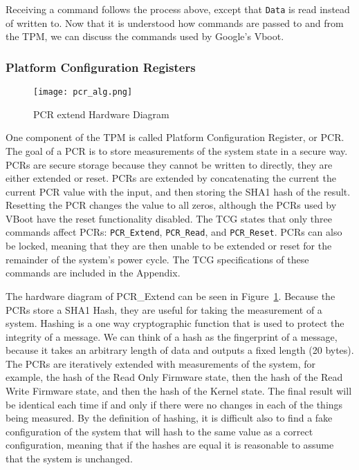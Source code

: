 \documentclass[../report.tex]{subfiles}
\def\code#1{\texttt{#1}}
\begin{document}
Receiving a command follows the process above, except that \code{Data} is read instead of written to.
Now that it is understood how commands are passed to and from the TPM, we can discuss the commands used by Google's Vboot.

\subsubsection{Platform Configuration Registers}

\begin{figure}
  \centering
  \texttt{[image: pcr\_alg.png]}
  \caption{PCR extend Hardware Diagram}
  \label{fig:pcr_alg}
\end{figure}

One component of the TPM is called Platform Configuration Register, or PCR.
The goal of a PCR is to store measurements of the system state in a secure way. 
PCRs are secure storage because they cannot be written to directly, they are either extended or reset. 
PCRs are extended by concatenating the current the current PCR value with the input, and then storing the SHA1 hash of the result. 
Resetting the PCR changes the value to all zeros, although the PCRs used by VBoot have the reset functionality disabled.
The TCG states that only three commands affect PCRs: \code{PCR\_Extend},
\code{PCR\_Read}, and \code{PCR\_Reset}.
PCRs can also be locked, meaning that they are then unable to be extended or reset for the remainder of the system's power cycle.
The TCG specifications of these commands are included in the Appendix.


The hardware diagram of PCR\_Extend can be seen in Figure~\ref{fig:pcr_alg}.
Because the PCRs store a SHA1 Hash, they are useful for taking the measurement of a system.  
Hashing is a one way cryptographic function that is used to protect the integrity of a message.
We can think of a hash as the fingerprint of a message, because it takes an arbitrary length of data and outputs a fixed length (20 bytes).
The PCRs are iteratively extended with measurements of the system, for example,
the hash of the Read Only Firmware state, then the hash of the Read Write
Firmware state, and then the hash of the Kernel state.
The final result will be identical each time if and only if there were no changes in each of the things being measured.
By the definition of hashing, it is difficult also to find a fake configuration of the system that will hash to the same value as a correct configuration, meaning that if the hashes are equal it is reasonable to assume that the system is unchanged. 
\end{document}
